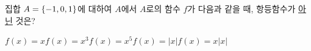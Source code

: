 집합 $A=\{-1{,}\mkern3mu\mathopen{}0{,}\mkern3mu\mathopen{}1\}$에 대하여 $A$에서 $A$로의 함수 $f$가 다음과 같을 때, 항등함수가 \underline{아닌} 것은?
\begin{choices32}{$f(x)=x$}{$f(x)=x^3$}{$f(x)=x^5$}{$f(x)=|x|$}{$f(x)=x|x|$}\end{choices32}
